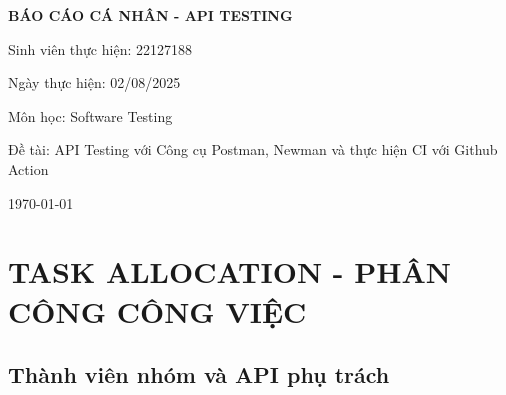 \documentclass[12pt,a4paper]{article}
\begin{document}
  \begin{titlepage}
  \centering
  \vspace*{2cm}

  {\Huge\bfseries BÁO CÁO CÁ NHÂN - API TESTING\par}

  \vspace{1cm}

  {\Large Sinh viên thực hiện: 22127188\par}

  \vspace{0.5cm}

  {\Large Ngày thực hiện: 02/08/2025\par}

  \vspace{0.5cm}

  {\Large Môn học: Software Testing\par}

  \vspace{0.5cm}

  {\Large Đề tài: API Testing với Công cụ Postman, Newman và thực hiện CI với Github Action\par}

  \vfill

  {\large \today\par}

  \end{titlepage}

  \newpage
  \tableofcontents
  \newpage

  \section{TASK ALLOCATION - PHÂN CÔNG CÔNG VIỆC}

  \subsection{Thành viên nhóm và API phụ trách}
\end{document}
